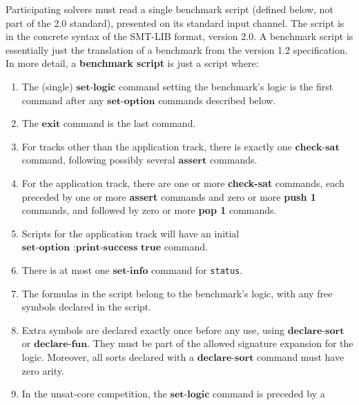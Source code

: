 \documentclass[12pt]{article}
\newcommand{\akey}[1]{\textbf{#1}}
\begin{document}
%
Participating solvers must read a single benchmark script (defined
below, not part of the 2.0 standard), presented on its standard input
channel. The script is in the concrete syntax of the SMT-LIB format,
version 2.0.  A benchmark script is essentially just the translation
of a benchmark from the version 1.2 specification.  In more detail, a
\textbf{benchmark script} is just a script where:

\begin{enumerate}
\item The (single) $\akey{set-logic}$ command setting the benchmark's
logic is the first command after any $\akey{set-option}$ commands described below.
\item The $\akey{exit}$ command is the last command.
\item For tracks other than the application track, there is exactly one $\akey{check-sat}$ command,
following possibly several $\akey{assert}$ commands.
\item For the application track, there are one or more \akey{check-sat} commands, 
  each preceded by one or more \akey{assert} commands 
  and zero or more \akey{push 1} commands, 
  and followed by zero or more \akey{pop 1} commands.
\item Scripts for the application track will have an initial $\akey{set-option :print-success true}$ command.
\item There is at most one $\akey{set-info}$ command for \texttt{status}.
\item The formulas in the script belong to the benchmark's logic, with
any free symbols declared in the script.
\item Extra symbols are declared exactly once before any
  use, using $\akey{declare-sort}$
  or $\akey{declare-fun}$.
  They must be part of the allowed signature expansion for the logic.
  Moreover, all sorts declared with a $\akey{declare-sort}$ command must have zero arity.
\item In the unsat-core competition, the $\akey{set-logic}$ command is preceded by a \\

\end{enumerate}
\end{document}
